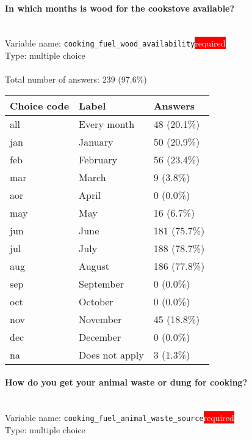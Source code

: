 \documentclass[11.5pt, a4paper]{scrartcl}
\begin{document}
\paragraph{In which months is wood for the cookstove available?}
\  \\Variable name: \texttt{cooking\_fuel\_wood\_availability}\hfill\colorbox{red}{\small{\textcolor{white}{required}}}\\
 Type: multiple choice\\
\\Total number of answers: 239 (97.6\%)
\\[0.2em] \begin{tabular}{p{4cm}|p{8cm}|p{3cm}}
Choice code & Label & Answers \\
\hline
all & Every month& \cellcolor{color1}48 (20.1\%)\\
\cellcolor{mygray} jan & \cellcolor{mygray}January & \cellcolor{color1}50 (20.9\%)\\
feb & February& \cellcolor{color1}56 (23.4\%)\\
\cellcolor{mygray} mar & \cellcolor{mygray}March & \cellcolor{color0}9 (3.8\%)\\
aor & April& \cellcolor{color0}0 (0.0\%)\\
\cellcolor{mygray} may & \cellcolor{mygray}May & \cellcolor{color0}16 (6.7\%)\\
jun & June& \cellcolor{color3}181 (75.7\%)\\
\cellcolor{mygray} jul & \cellcolor{mygray}July & \cellcolor{color3}188 (78.7\%)\\
aug & August& \cellcolor{color3}186 (77.8\%)\\
\cellcolor{mygray} sep  & \cellcolor{mygray}September & \cellcolor{color0}0 (0.0\%)\\
oct  & October& \cellcolor{color0}0 (0.0\%)\\
\cellcolor{mygray} nov & \cellcolor{mygray}November & \cellcolor{color0}45 (18.8\%)\\
dec  & December& \cellcolor{color0}0 (0.0\%)\\
\cellcolor{mygray} na & \cellcolor{mygray}Does not apply & \cellcolor{color0}3 (1.3\%)\\
\end{tabular}
\paragraph{How do you get your animal waste or dung for cooking?}
\  \\Variable name: \texttt{cooking\_fuel\_animal\_waste\_source}\hfill\colorbox{red}{\small{\textcolor{white}{required}}}\\
 Type: multiple choice\\
\end{document}
